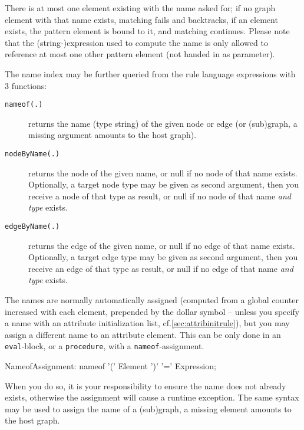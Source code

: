 There is at most one element existing with the name asked for; if no graph element with that name exists, matching fails and backtracks, if an element exists, the pattern element is bound to it, and matching continues.
Please note that the (string-)expression used to compute the name is only allowed to reference at most one other pattern element (not handed in as parameter).

The name index may be further queried from the rule language expressions with 3 functions:
\begin{description}
\item[\texttt{nameof(.)}] returns the name (type string) of the given node or edge (or (sub)graph, a missing argument amounts to the host graph).
\item[\texttt{nodeByName(.)}] returns the node of the given name, or null if no node of that name exists. Optionally, a target node type may be given as second argument, then you receive a node of that type as result, or null if no node of that name \emph{and type} exists.
\item[\texttt{edgeByName(.)}] returns the edge of the given name, or null if no edge of that name exists. Optionally, a target edge type may be given as second argument, then you receive an edge of that type as result, or null if no edge of that name \emph{and type} exists.
\end{description}

The names are normally automatically assigned (computed from a global counter increased with each element, prepended by the dollar symbol -- unless you specify a name with an attribute initialization list, cf.\ref{sec:attribinitrule}), but you may assign a different name to an attribute element.
This can be only done in an \texttt{eval}-block, or a \texttt{procedure}, with a \texttt{nameof}-assignment.

\begin{rail}
  NameofAssignment:
    nameof '(' Element ')' '=' Expression;
\end{rail}

When you do so, it is your responsibility to ensure the name does not already exists, otherwise the assignment will cause a runtime exception.
The same syntax may be used to assign the name of a (sub)graph, a missing element amounts to the host graph.

